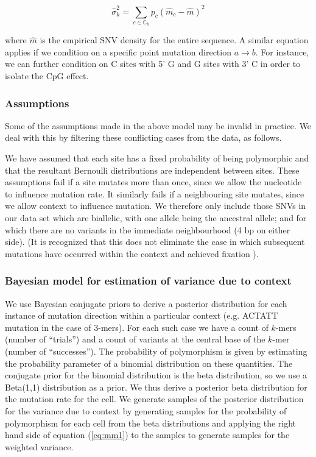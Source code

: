 $$\hat{\sigma}^2_k = \sum_{c \in \mathbb{C}_k}p_c{(\hat{m}_c- \hat{m})}^2$$

\noindent where $\hat{m}$ is the empirical SNV density for the entire sequence. A similar equation applies if we condition on a specific point mutation direction $a\rightarrow b$. For instance, we can further condition on C sites with 5' G and G sites with 3' C in order to isolate the CpG effect.

\subsubsection*{Assumptions}\label{assumptions}

Some of the assumptions made in the above model may be invalid in practice. We deal with this by filtering these conflicting cases from the data, as follows.

We have assumed that each site has a fixed probability of being polymorphic and that the resultant Bernoulli distributions are independent between sites. These assumptions fail if a site mutates more than once, since we allow the nucleotide to influence mutation rate. It similarly fails if a neighbouring site mutates, since we allow context to influence mutation. We therefore only include those SNVs in our data set which are biallelic, with one allele being the ancestral allele; and for which there are no variants in the immediate neighbourhood (4 bp on either side). (It is recognized that this does not eliminate the case in which subsequent mutations have occurred within the context and achieved fixation ).

\subsubsection*{Bayesian model for estimation of variance due to context}

We use Bayesian conjugate priors to derive a posterior distribution for each instance of mutation direction within a particular context (e.g. ACT\textrightarrow ATT mutation in the case of 3-mers). For each such case we have a count of $k$-mers (number of ``trials'') and a count of variants at the central base of the $k$-mer (number of ``successes''). The probability of polymorphism is given by estimating the probability parameter of a binomial distribution on these quantities. The conjugate prior for the binomial distribution is the beta distribution, so we use a Beta(1,1) distribution as a prior. We thus derive a posterior beta distribution for the mutation rate for the cell. We generate samples of the posterior distribution for the variance due to context by generating samples for the probability of polymorphism for each cell from the beta distributions and applying the right hand side of equation (\ref{eq:mm1}) to the samples to generate samples for the weighted variance. 

